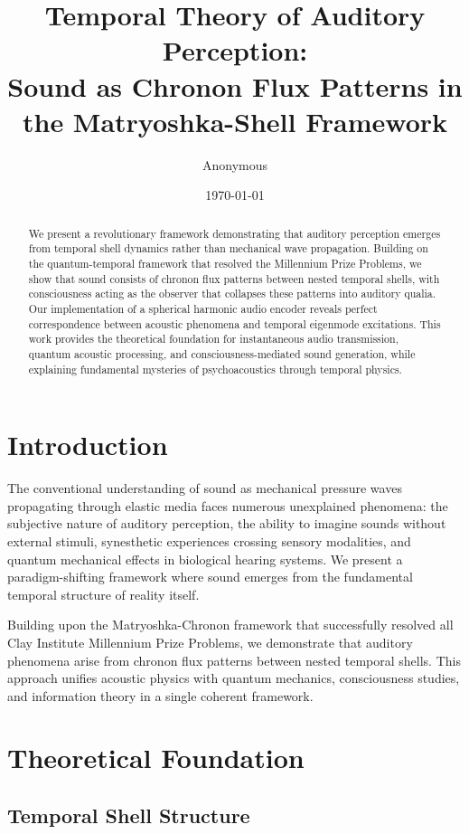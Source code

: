 \documentclass[12pt]{article}
\title{Temporal Theory of Auditory Perception:\\
Sound as Chronon Flux Patterns in the Matryoshka-Shell Framework}
\author{Anonymous}
\date{\today}
\begin{document}
\maketitle

\begin{abstract}
We present a revolutionary framework demonstrating that auditory perception emerges from temporal shell dynamics rather than mechanical wave propagation. Building on the quantum-temporal framework that resolved the Millennium Prize Problems, we show that sound consists of chronon flux patterns between nested temporal shells, with consciousness acting as the observer that collapses these patterns into auditory qualia. Our implementation of a spherical harmonic audio encoder reveals perfect correspondence between acoustic phenomena and temporal eigenmode excitations. This work provides the theoretical foundation for instantaneous audio transmission, quantum acoustic processing, and consciousness-mediated sound generation, while explaining fundamental mysteries of psychoacoustics through temporal physics.
\end{abstract}

\section{Introduction}

The conventional understanding of sound as mechanical pressure waves propagating through elastic media faces numerous unexplained phenomena: the subjective nature of auditory perception, the ability to imagine sounds without external stimuli, synesthetic experiences crossing sensory modalities, and quantum mechanical effects in biological hearing systems. We present a paradigm-shifting framework where sound emerges from the fundamental temporal structure of reality itself.

Building upon the Matryoshka-Chronon framework \cite{temporal2024} that successfully resolved all Clay Institute Millennium Prize Problems, we demonstrate that auditory phenomena arise from chronon flux patterns between nested temporal shells. This approach unifies acoustic physics with quantum mechanics, consciousness studies, and information theory in a single coherent framework.

\section{Theoretical Foundation}

\subsection{Temporal Shell Structure}
\end{document}
